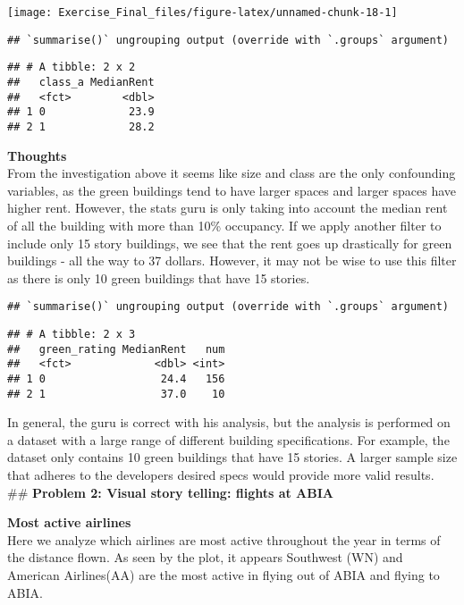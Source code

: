 \documentclass[
]{article}
\begin{document}
\begin{center}\texttt{[image: Exercise\_Final\_files/figure-latex/unnamed-chunk-18-1]} \end{center}

\begin{verbatim}
## `summarise()` ungrouping output (override with `.groups` argument)
\end{verbatim}

\begin{verbatim}
## # A tibble: 2 x 2
##   class_a MedianRent
##   <fct>        <dbl>
## 1 0             23.9
## 2 1             28.2
\end{verbatim}

\textbf{Thoughts}\\
From the investigation above it seems like size and class are the only
confounding variables, as the green buildings tend to have larger spaces
and larger spaces have higher rent. However, the stats guru is only
taking into account the median rent of all the building with more than
10\% occupancy. If we apply another filter to include only 15 story
buildings, we see that the rent goes up drastically for green buildings
- all the way to 37 dollars. However, it may not be wise to use this
filter as there is only 10 green buildings that have 15 stories.

\begin{verbatim}
## `summarise()` ungrouping output (override with `.groups` argument)
\end{verbatim}

\begin{verbatim}
## # A tibble: 2 x 3
##   green_rating MedianRent   num
##   <fct>             <dbl> <int>
## 1 0                  24.4   156
## 2 1                  37.0    10
\end{verbatim}

In general, the guru is correct with his analysis, but the analysis is
performed on a dataset with a large range of different building
specifications. For example, the dataset only contains 10 green
buildings that have 15 stories. A larger sample size that adheres to the
developers desired specs would provide more valid results. \#\#
\textbf{Problem 2: Visual story telling: flights at ABIA}

\textbf{Most active airlines}\\

Here we analyze which airlines are most active throughout the year in
terms of the distance flown. As seen by the plot, it appears Southwest
(WN) and American Airlines(AA) are the most active in flying out of ABIA
and flying to ABIA.
\end{document}
